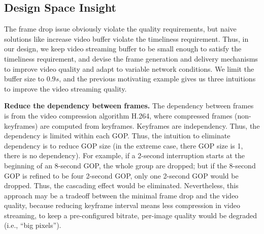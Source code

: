 \vspace{-0.05in}  
\subsection{Design Space Insight}
The frame drop issue obviously violate the quality requirements, but naive solutions like increase video buffer violate the timeliness requirement. Thus, in our design, we keep video streaming buffer to be small enough to satisfy the timeliness requirement, and devise the frame generation and delivery mechanisms to improve video quality and adapt to variable network conditions. We limit the buffer size to $0.9s$, and the previous motivating example gives us three intuitions to improve the video streaming quality.


\textbf{Reduce the dependency between frames.}
The dependency between frames is from the video compression algorithm H.264, where compressed frames (non-keyframes) are computed from keyframes. Keyframes are independency. Thus, the dependency is limited within each GOP. Thus, the intuition to eliminate dependency is to reduce GOP size (in the extreme case, there GOP size is 1, there is no dependency). For example, if a 2-second interruption starts at the beginning of an 8-second GOP, the whole group are dropped; but if the 8-second GOP is refined to be four 2-second GOP, only one 2-second GOP would be dropped. Thus, the cascading effect would be eliminated. Nevertheless, this approach may be a tradeoff between the minimal frame drop and the video quality, because reducing keyframe interval means less compression in video streaming, to keep a pre-configured bitrate, per-image quality would be degraded (i.e., ``big pixels'').


